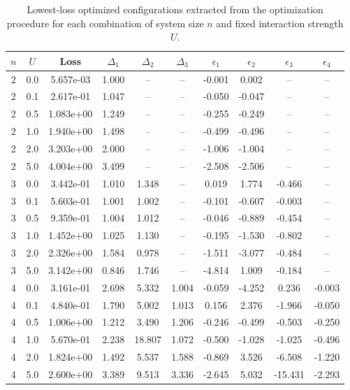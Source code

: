 \begin{table}[p]
  \centering
  \begin{tabular}{cccccccccc}
    \hline
    $n$ & $U$ & Loss & $\Delta_1$ & $\Delta_2$ & $\Delta_3$ & $\epsilon_1$ & $\epsilon_2$ & $\epsilon_3$ & $\epsilon_4$ \\
    \hline
    2 & 0.0 & 5.657e-03 & 1.000 & -- & -- & -0.001 & 0.002 & -- & -- \\
    2 & 0.1 & 2.617e-01 & 1.047 & -- & -- & -0.050 & -0.047 & -- & -- \\
    2 & 0.5 & 1.083e+00 & 1.249 & -- & -- & -0.255 & -0.249 & -- & -- \\
    2 & 1.0 & 1.940e+00 & 1.498 & -- & -- & -0.499 & -0.496 & -- & -- \\
    2 & 2.0 & 3.203e+00 & 2.000 & -- & -- & -1.006 & -1.004 & -- & -- \\
    2 & 5.0 & 4.004e+00 & 3.499 & -- & -- & -2.508 & -2.506 & -- & -- \\
    \hline
    3 & 0.0 & 3.442e-01 & 1.010 & 1.348 & -- & 0.019 & 1.774 & -0.466 & -- \\
    3 & 0.1 & 5.603e-01 & 1.001 & 1.002 & -- & -0.101 & -0.607 & -0.003 & -- \\
    3 & 0.5 & 9.359e-01 & 1.004 & 1.012 & -- & -0.046 & -0.889 & -0.454 & -- \\
    3 & 1.0 & 1.452e+00 & 1.025 & 1.130 & -- & -0.195 & -1.530 & -0.802 & -- \\
    3 & 2.0 & 2.326e+00 & 1.584 & 0.978 & -- & -1.511 & -3.077 & -0.484 & -- \\
    3 & 5.0 & 3.142e+00 & 0.846 & 1.746 & -- & -4.814 & 1.009 & -0.184 & -- \\
    \hline
    4 & 0.0 & 3.161e-01 & 2.698 & 5.332 & 1.004 & -0.059 & -4.252 & 0.236 & -0.003 \\
    4 & 0.1 & 4.840e-01 & 1.790 & 5.002 & 1.013 & 0.156 & 2.376 & -1.966 & -0.050 \\
    4 & 0.5 & 1.006e+00 & 1.212 & 3.490 & 1.206 & -0.246 & -0.499 & -0.503 & -0.250 \\
    4 & 1.0 & 5.670e-01 & 2.238 & 18.807 & 1.072 & -0.500 & -1.028 & -1.025 & -0.496 \\
    4 & 2.0 & 1.824e+00 & 1.492 & 5.537 & 1.588 & -0.869 & 3.526 & -6.508 & -1.220 \\
    4 & 5.0 & 2.600e+00 & 3.389 & 9.513 & 3.336 & -2.645 & 5.032 & -15.431 & -2.293 \\
    \hline
  \end{tabular}
  \caption{Lowest-loss optimized configurations extracted from the optimization procedure for each combination of system size $n$ and fixed interaction strength $U$.}
  \label{tab:best_optimized_configs}
\end{table}



